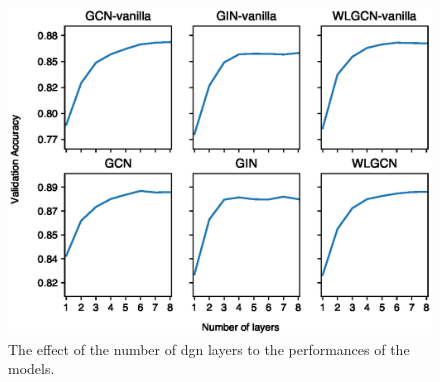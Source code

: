 \begin{figure}[h!]
    \centering
    \includegraphics[width=.8\textwidth]{Figures/Chapter5/e1-layering}
    \caption{The effect of the number of \gls{dgn} layers to the performances of the models.}
    \label{fig:e1-layering}
\end{figure}

